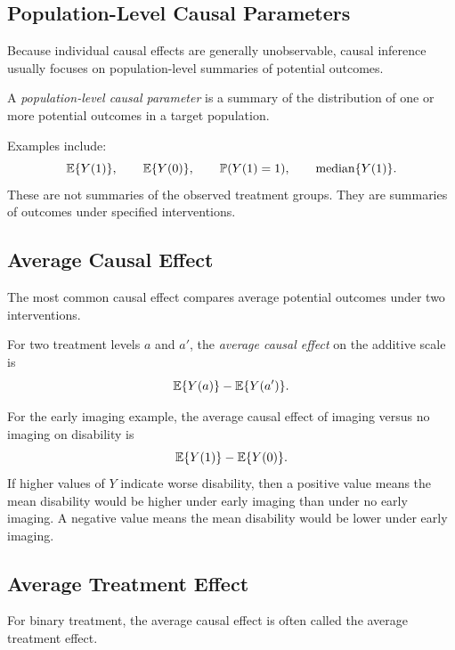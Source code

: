 \label{lec:2-6}

\subsection{Population-Level Causal Parameters}

Because individual causal effects are generally unobservable, causal inference usually focuses on population-level summaries of potential outcomes.

\begin{definition}
A \emph{population-level causal parameter} is a summary of the distribution of one or more potential outcomes in a target population.
\end{definition}

Examples include:
\[
\mathbb{E}\{Y(1)\},\qquad
\mathbb{E}\{Y(0)\},\qquad
\mathbb{P}(Y(1)=1),\qquad
\operatorname{median}\{Y(1)\}.
\]
These are not summaries of the observed treatment groups. They are summaries of outcomes under specified interventions.

\subsection{Average Causal Effect}

The most common causal effect compares average potential outcomes under two interventions.

\begin{definition}
For two treatment levels $a$ and $a'$, the \emph{average causal effect} on the additive scale is
\[
\mathbb{E}\{Y(a)\}-\mathbb{E}\{Y(a')\}.
\]
\end{definition}

For the early imaging example, the average causal effect of imaging versus no imaging on disability is
\[
\mathbb{E}\{Y(1)\}-\mathbb{E}\{Y(0)\}.
\]
If higher values of $Y$ indicate worse disability, then a positive value means the mean disability would be higher under early imaging than under no early imaging. A negative value means the mean disability would be lower under early imaging.

\subsection{Average Treatment Effect}

For binary treatment, the average causal effect is often called the average treatment effect.

